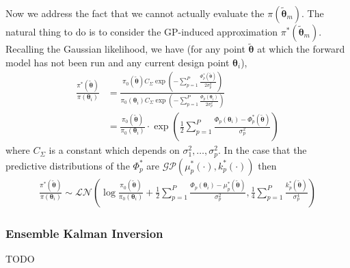 \documentclass[12pt]{article}
\newcommand{\btheta}{\boldsymbol{\theta}}
\begin{document}
Now we address the fact that we cannot actually evaluate the $\pi(\tilde{\btheta}_m)$. The natural thing to do is to consider the GP-induced approximation $\pi^*(\tilde{\btheta}_m)$. Recalling the 
Gaussian likelihood, we have (for any point $\tilde{\btheta}$ at which the forward model has not been run and any current design point $\btheta_i$),
\begin{align*}
\frac{\pi^*(\tilde{\btheta})}{\pi(\btheta_i)} &= \frac{\pi_0(\tilde{\btheta}) C_\Sigma \exp\left(-\sum_{p = 1}^{P} \frac{\Phi_p^*(\tilde{\btheta})}{2\sigma_p^2} \right)}{\pi_0(\btheta_i)C_\Sigma \exp\left(- \sum_{p = 1}^{P} \frac{\Phi_p(\btheta_i)}{2\sigma_p^2} \right)} \\
							    &= \frac{\pi_0(\tilde{\btheta})}{\pi_0(\btheta_i)} \cdot \exp\left(\frac{1}{2} \sum_{p = 1}^{P} \frac{\Phi_p(\btheta_i) - \Phi_p^*(\tilde{\btheta})}{\sigma_p^2} \right)
\end{align*}
where $C_\Sigma$ is a constant which depends on $\sigma_1^2, \dots, \sigma_p^2$. In the case that the predictive distributions of the $\Phi^*_p$ are $\mathcal{GP}(\mu^*_p(\cdot), k_p^*(\cdot))$ then 
\begin{align*}
\frac{\pi^*(\tilde{\btheta})}{\pi(\btheta_i)} \sim \mathcal{LN}\left(\log\frac{\pi_0(\tilde{\btheta})}{\pi_0(\btheta_i)} + \frac{1}{2} \sum_{p = 1}^{P} \frac{\Phi_p(\btheta_i) - \mu_p^*(\tilde{\btheta})}{\sigma_p^2}, \frac{1}{4} \sum_{p = 1}^{P} \frac{k_p^*(\tilde{\btheta})}{\sigma_p^4} \right)
\end{align*}


\subsubsection{Ensemble Kalman Inversion}
TODO


 

\end{document}
